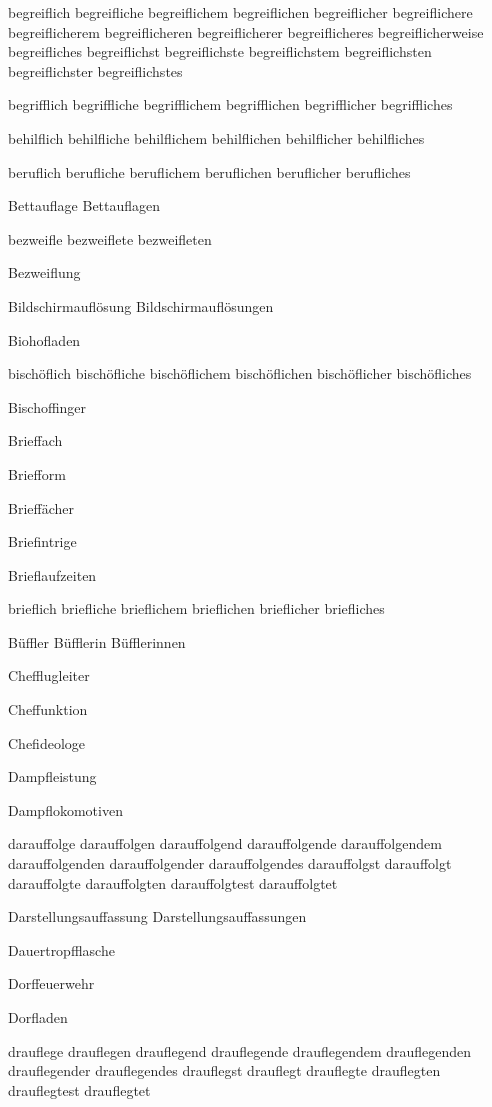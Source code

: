 begreiflich begreifliche begreiflichem begreiflichen begreiflicher begreiflichere begreiflicherem begreiflicheren begreiflicherer begreiflicheres begreiflicherweise begreifliches begreiflichst begreiflichste begreiflichstem begreiflichsten begreiflichster begreiflichstes

begrifflich begriffliche begrifflichem begrifflichen begrifflicher begriffliches

behilflich behilfliche behilflichem behilflichen behilflicher behilfliches

beruflich berufliche beruflichem beruflichen beruflicher berufliches

Bettauflage Bettauflagen

bezweifle bezweiflete bezweifleten

Bezweiflung

Bildschirmauflösung Bildschirmauflösungen

Biohofladen

bischöflich bischöfliche bischöflichem bischöflichen bischöflicher bischöfliches

Bischoffinger

Brieffach

Briefform

Brieffächer

Briefintrige

Brieflaufzeiten

brieflich briefliche brieflichem brieflichen brieflicher briefliches

Büffler Büfflerin Büfflerinnen

Chefflugleiter

Cheffunktion

Chefideologe

Dampfleistung

Dampflokomotiven

darauffolge darauffolgen darauffolgend darauffolgende darauffolgendem darauffolgenden darauffolgender darauffolgendes darauffolgst darauffolgt darauffolgte darauffolgten darauffolgtest darauffolgtet

Darstellungsauffassung Darstellungsauffassungen

Dauertropfflasche

Dorffeuerwehr

Dorfladen

drauflege drauflegen drauflegend drauflegende drauflegendem drauflegenden drauflegender drauflegendes drauflegst drauflegt drauflegte drauflegten drauflegtest drauflegtet

